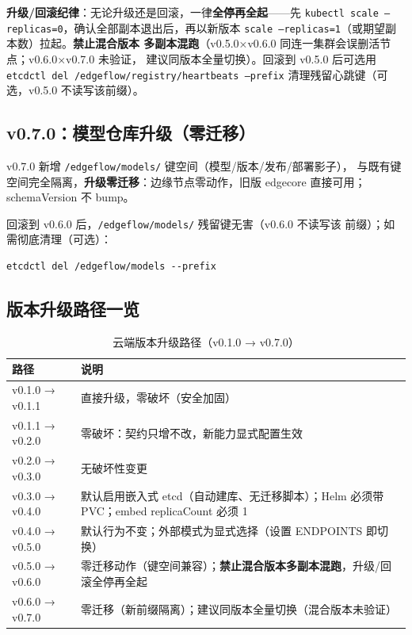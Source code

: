 \textbf{升级/回滚纪律}：无论升级还是回滚，一律\textbf{全停再全起}——先
\texttt{kubectl scale --replicas=0}，确认全部副本退出后，再以新版本
\texttt{scale --replicas=1}（或期望副本数）拉起。\textbf{禁止混合版本
多副本混跑}（v0.5.0×v0.6.0 同连一集群会误删活节点；v0.6.0×v0.7.0 未验证，
建议同版本全量切换）。回滚到 v0.5.0 后可选用 \texttt{etcdctl del
/edgeflow/registry/heartbeats --prefix} 清理残留心跳键（可选，v0.5.0
不读写该前缀）。

\subsection{v0.7.0：模型仓库升级（零迁移）}

v0.7.0 新增 \texttt{/edgeflow/models/} 键空间（模型/版本/发布/部署影子），
与既有键空间完全隔离，\textbf{升级零迁移}：边缘节点零动作，旧版 edgecore
直接可用；schemaVersion 不 bump。

回滚到 v0.6.0 后，\texttt{/edgeflow/models/} 残留键无害（v0.6.0 不读写该
前缀）；如需彻底清理（可选）：

\begin{lstlisting}
etcdctl del /edgeflow/models --prefix
\end{lstlisting}

\subsection{版本升级路径一览}

\begin{table}[htbp]
\centering
\caption{云端版本升级路径（v0.1.0 → v0.7.0）}
\label{tab:7-upgrade-path}
\begin{tabularx}{\textwidth}{l X}
\toprule
\textbf{路径} & \textbf{说明} \\
\midrule
v0.1.0 → v0.1.1 & 直接升级，零破坏（安全加固） \\
v0.1.1 → v0.2.0 & 零破坏：契约只增不改，新能力显式配置生效 \\
v0.2.0 → v0.3.0 & 无破坏性变更 \\
v0.3.0 → v0.4.0 & 默认启用嵌入式 etcd（自动建库、无迁移脚本）；Helm 必须带 PVC；embed replicaCount 必须 1 \\
v0.4.0 → v0.5.0 & 默认行为不变；外部模式为显式选择（设置 ENDPOINTS 即切换） \\
v0.5.0 → v0.6.0 & 零迁移动作（键空间兼容）；\textbf{禁止混合版本多副本混跑}，升级/回滚全停再全起 \\
v0.6.0 → v0.7.0 & 零迁移（新前缀隔离）；建议同版本全量切换（混合版本未验证） \\
\bottomrule
\end{tabularx}
\end{table}

